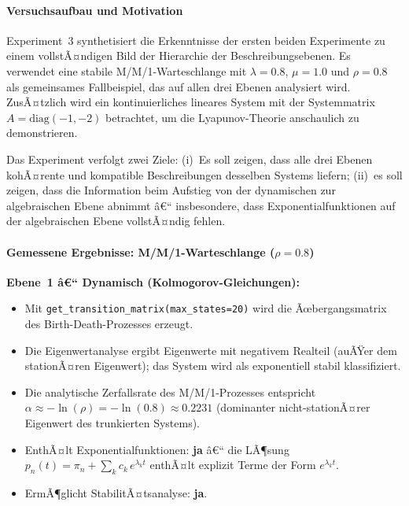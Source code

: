 ﻿\documentclass[a4paper,12pt]{scrreprt}
\theoremstyle{definition}
\begin{document}
\paragraph{Versuchsaufbau und Motivation}

Experiment~3 synthetisiert die Erkenntnisse der ersten beiden
Experimente zu einem vollstÃ¤ndigen Bild der Hierarchie der
Beschreibungsebenen.  Es verwendet eine stabile M/M/1-Warteschlange
mit $\lambda = 0.8$, $\mu = 1.0$ und $\rho = 0.8$ als gemeinsames
Fallbeispiel, das auf allen drei Ebenen analysiert wird.  ZusÃ¤tzlich
wird ein kontinuierliches lineares System mit der Systemmatrix
$A = \text{diag}(-1, -2)$ betrachtet, um die Lyapunov-Theorie
anschaulich zu demonstrieren.

Das Experiment verfolgt zwei Ziele: (i)~Es soll zeigen, dass alle drei
Ebenen kohÃ¤rente und kompatible Beschreibungen desselben Systems
liefern; (ii)~es soll zeigen, dass die Information beim Aufstieg von
der dynamischen zur algebraischen Ebene abnimmt â€“ insbesondere, dass
Exponentialfunktionen auf der algebraischen Ebene vollstÃ¤ndig fehlen.

\paragraph{Gemessene Ergebnisse: M/M/1-Warteschlange ($\rho = 0.8$)}

\textbf{Ebene~1 â€“ Dynamisch (Kolmogorov-Gleichungen):}
\begin{itemize}
	\item Mit \texttt{get\_transition\_matrix(max\_states=20)} wird die Ãœbergangsmatrix des Birth-Death-Prozesses erzeugt.
	\item Die Eigenwertanalyse ergibt Eigenwerte mit negativem Realteil
	(auÃŸer dem stationÃ¤ren Eigenwert); das System wird als
	exponentiell stabil klassifiziert.
	\item Die analytische Zerfallsrate des M/M/1-Prozesses entspricht
	$\alpha \approx -\ln(\rho) = -\ln(0.8) \approx 0.2231$
	(dominanter nicht-stationÃ¤rer Eigenwert des trunkierten
	Systems).
	\item EnthÃ¤lt Exponentialfunktionen: \textbf{ja} â€“ die LÃ¶sung
	$p_n(t) = \pi_n + \sum_k c_k\,e^{\lambda_k t}$ enthÃ¤lt
	explizit Terme der Form $e^{\lambda_k t}$.
	\item ErmÃ¶glicht StabilitÃ¤tsanalyse: \textbf{ja}.
\end{itemize}
\end{document}
